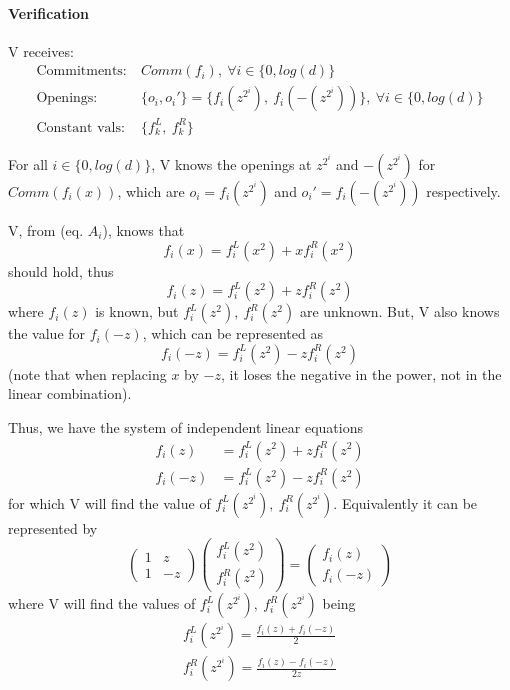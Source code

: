 \documentclass{article}
\theoremstyle{definition}
\begin{document}
\paragraph{Verification}

V receives:
\begin{align*}
	\text{Commitments:}~ &Comm(f_i),~ \forall i \in \{0, log(d)\}\\
	\text{Openings:}~ &\{o_i, o_i'\}=\{ f_i(z^{2^i}),~f_i(-(z^{2^i})) \},~ \forall i \in \{0, log(d)\}\\
	\text{Constant vals:}~ &\{f_k^L,~f_k^R\}
\end{align*}

\vspace{20px}

For all $i \in \{0, log(d)\}$, V knows the openings at $z^{2^i}$ and $-(z^{2^i})$ for $Comm(f_i(x))$, which are $o_i=f_i(z^{2^i})$ and $o_i'=f_i(-(z^{2^i}))$ respectively.

V, from (eq. $A_i$), knows that
$$f_i(x)=f_i^L(x^2) + x f_i^R(x^2)$$
should hold, thus
$$f_i(z)=f_i^L(z^2) + z f_i^R(z^2)$$
where $f_i(z)$ is known, but $f_i^L(z^2),~f_i^R(z^2)$ are unknown.
But, V also knows the value for $f_i(-z)$, which can be represented as
$$f_i(-z)=f_i^L(z^2) - z f_i^R(z^2)$$
(note that when replacing $x$ by $-z$, it loses the negative in the power, not in the linear combination).

Thus, we have the system of independent linear equations
\begin{align*} %
	f_i(z)&=f_i^L(z^2) + z f_i^R(z^2)\\
	f_i(-z)&=f_i^L(z^2) - z f_i^R(z^2)
\end{align*}
for which V will find the value of $f_i^L(z^{2^i}),~f_i^R(z^{2^i})$.
Equivalently it can be represented by
$$
\begin{pmatrix}
	1 & z\\
	1 & -z
\end{pmatrix}
\begin{pmatrix}
	f_i^L(z^2)\\
	f_i^R(z^2)
\end{pmatrix}
=
\begin{pmatrix}
	f_i(z)\\
	f_i(-z)
\end{pmatrix}
$$
where V will find the values of $f_i^L(z^{2^i}),~f_i^R(z^{2^i})$ being
\begin{align*}
	f_i^L(z^{2^i})=\frac{f_i(z) + f_i(-z)}{2}\\
	f_i^R(z^{2^i})=\frac{f_i(z) - f_i(-z)}{2z}\\
\end{align*}
\end{document}
